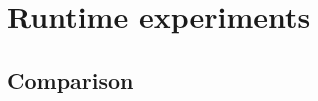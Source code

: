 
\section{Runtime experiments}
\label{sec:runtime}





\subsection{Comparison}
\label{sec:runtime_comparison}
